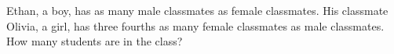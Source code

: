 Ethan, a boy, has as many male classmates as female classmates. His classmate Olivia, a girl, has three fourths as many female classmates as male classmates. How many students are in the class?
